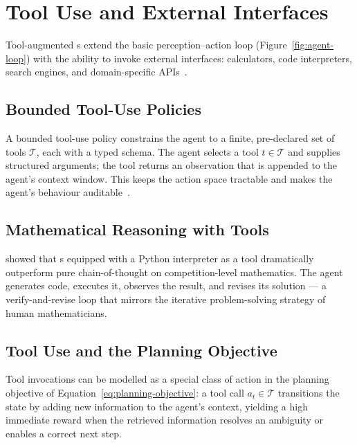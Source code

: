 \chapter{Tool Use and External Interfaces}
\label{chap:tooluse}

Tool-augmented \LLM{}s extend the basic perception--action loop
(Figure~\ref{fig:agent-loop}) with the ability to invoke external
interfaces: calculators, code interpreters, search engines, and
domain-specific APIs~\cite{wu2025agenticreasoningtools}.

\section{Bounded Tool-Use Policies}
\label{sec:tooluse-policies}

A bounded tool-use policy constrains the agent to a finite, pre-declared
set of tools $\mathcal{T}$, each with a typed schema.
The agent selects a tool $t \in \mathcal{T}$ and supplies structured
arguments; the tool returns an observation that is appended to the agent's
context window.
This keeps the action space tractable and makes the agent's behaviour
auditable~\cite{wu2025agenticreasoningtools}.

\section{Mathematical Reasoning with Tools}
\label{sec:tooluse-math}

\cite{liu2025agenticmath} showed that \LLM{}s equipped with a Python
interpreter as a tool dramatically outperform pure chain-of-thought on
competition-level mathematics.
The agent generates code, executes it, observes the result, and revises
its solution — a verify-and-revise loop that mirrors the iterative
problem-solving strategy of human mathematicians.

\section{Tool Use and the Planning Objective}
\label{sec:tooluse-planning}

Tool invocations can be modelled as a special class of action in the
planning objective of Equation~\eqref{eq:planning-objective}: a tool call
$a_t \in \mathcal{T}$ transitions the state by adding new information to
the agent's context, yielding a high immediate reward when the retrieved
information resolves an ambiguity or enables a correct next step.

